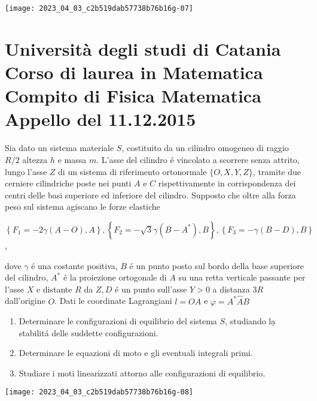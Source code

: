 \documentclass[10pt]{article}
\begin{document}
\begin{center}
\texttt{[image: 2023\_04\_03\_c2b519dab57738b76b16g-07]}
\end{center}

\section{Università degli studi di Catania
Corso di laurea in Matematica
Compito di Fisica Matematica
Appello del 11.12.2015}
Sia dato un sistema materiale \(S\), costituito da un cilindro omogeneo di raggio \(R / 2\) altezza \(h\) e massa \(m\). L'asse del cilindro é vincolato a scorrere senza attrito, lungo l'asse \(Z\) di un sistema di riferimento ortonormale \(\{O, X, Y, Z\}\), tramite due cerniere cilindriche poste nei punti \(A\) e \(C\) rispettivamente in corrispondenza dei centri delle basi superiore ed inferiore del cilindro. Supposto che oltre alla forza peso sul sistema agiscano le forze elastiche

\(\left\{F_{1}=-2 \gamma(A-O), A\right\},\left\{F_{2}=-\sqrt{3} \gamma\left(B-A^{*}\right), B\right\},\left\{F_{3}=-\gamma(B-D), B\right\}\),

dove \(\gamma\) é una costante positiva, \(B\) é un punto posto sul bordo della base superiore del cilindro, \(A^{*}\) é la proiezione ortogonale di \(A\) su una retta verticale passante per l'asse \(X\) e distante \(R\) da \(Z, D\) é un punto sull'asse \(Y>0\) a distanza \(3 R\) dall'origine \(O\). Dati le coordinate Lagrangiani \(l=O A\) e \(\varphi=A^{*} \widehat{A} B\)

\begin{enumerate}
  \item Determinare le configurazioni di equilibrio del sistema \(S\), studiando lạ stabilitá delle suddette configurazioni.

  \item Determinare le equazioni di moto e gli eventuali integrali primi.

  \item Studiare i moti linearizzati attorno alle configurazioni di equilibrio.

\end{enumerate}

\begin{center}
\texttt{[image: 2023\_04\_03\_c2b519dab57738b76b16g-08]}
\end{center}
\end{document}
